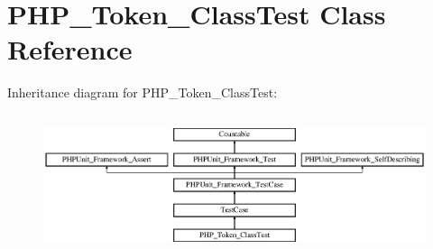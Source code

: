 \hypertarget{class_p_h_p___token___class_test}{}\section{P\+H\+P\+\_\+\+Token\+\_\+\+Class\+Test Class Reference}
\label{class_p_h_p___token___class_test}
Inheritance diagram for P\+H\+P\+\_\+\+Token\+\_\+\+Class\+Test\+:\begin{figure}[H]
\begin{center}
\leavevmode
\includegraphics[height=4.129793cm]{class_p_h_p___token___class_test}
\end{center}
\end{figure}

